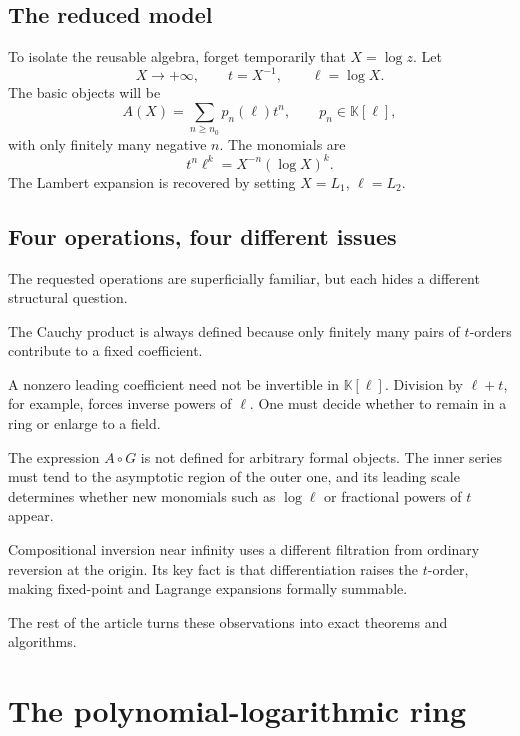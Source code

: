 \documentclass[11pt,oneside,openany]{book}
\newcommand{\K}{\mathbb{K}}
\newcommand{\compose}{\mathbin{\circ}}
\begin{document}
\section{The reduced model}
To isolate the reusable algebra, forget temporarily that \(X=\log z\).  Let
\[
  X\to+\infty,
  \qquad
  t=X^{-1},
  \qquad
  \ell=\log X.
\]
The basic objects will be
\begin{equation}\label{eq:basicform}
  A(X)=\sum_{n\geq n_0}p_n(\ell)t^n,
  \qquad p_n\in\K[\ell],
\end{equation}
with only finitely many negative \(n\).  The monomials are
\[
  t^n\ell^k=X^{-n}(\log X)^k.
\]
The Lambert expansion is recovered by setting \(X=L_1\), \(\ell=L_2\).

\section{Four operations, four different issues}
The requested operations are superficially familiar, but each hides a
different structural question.

\begin{description}[style=nextline]
\item[Multiplication.]
The Cauchy product is always defined because only finitely many pairs of
\(t\)-orders contribute to a fixed coefficient.

\item[Division.]
A nonzero leading coefficient need not be invertible in \(\K[\ell]\).  Division
by \(\ell+t\), for example, forces inverse powers of \(\ell\).  One must decide
whether to remain in a ring or enlarge to a field.

\item[Composition.]
The expression \(A\compose G\) is not defined for arbitrary formal objects.
The inner series must tend to the asymptotic region of the outer one, and its
leading scale determines whether new monomials such as \(\log\ell\) or
fractional powers of \(t\) appear.

\item[Series reversal.]
Compositional inversion near infinity uses a different filtration from
ordinary reversion at the origin.  Its key fact is that differentiation raises
the \(t\)-order, making fixed-point and Lagrange expansions formally summable.
\end{description}

The rest of the article turns these observations into exact theorems and
algorithms.

\chapter{The polynomial-logarithmic ring}
\label{ch:formal}
\end{document}
